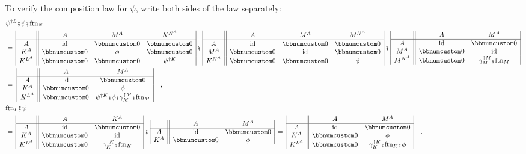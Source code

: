 To verify the composition law for $\psi$, write both sides of the
law separately:
\begin{align*}
 & \psi^{\uparrow L}\bef\psi\bef\text{ftn}_{N}\\
 & =\,\begin{array}{|c||ccc|}
 & A & M^{A} & K^{N^{A}}\\
\hline A & \text{id} & \bbnum 0 & \bbnum 0\\
K^{A} & \bbnum 0 & \phi & \bbnum 0\\
K^{L^{A}} & \bbnum 0 & \bbnum 0 & \psi^{\uparrow K}
\end{array}\,\bef\,\begin{array}{|c||ccc|}
 & A & M^{A} & M^{N^{A}}\\
\hline A & \text{id} & \bbnum 0 & \bbnum 0\\
M^{A} & \bbnum 0 & \text{id} & \bbnum 0\\
K^{N^{A}} & \bbnum 0 & \bbnum 0 & \phi
\end{array}\,\bef\,\begin{array}{|c||cc|}
 & A & M^{A}\\
\hline A & \text{id} & \bbnum 0\\
M^{A} & \bbnum 0 & \text{id}\\
M^{N^{A}} & \bbnum 0 & \gamma_{M}^{\uparrow M}\bef\text{ftn}_{M}
\end{array}\\
 & =\,\,\begin{array}{|c||cc|}
 & A & M^{A}\\
\hline A & \text{id} & \bbnum 0\\
K^{A} & \bbnum 0 & \phi\\
K^{L^{A}} & \bbnum 0 & \psi^{\uparrow K}\bef\phi\bef\gamma_{M}^{\uparrow M}\bef\text{ftn}_{M}
\end{array}\quad,\\
 & \text{ftn}_{L}\bef\psi\\
 & =\,\begin{array}{|c||cc|}
 & A & K^{A}\\
\hline A & \text{id} & \bbnum 0\\
K^{A} & \bbnum 0 & \text{id}\\
K^{L^{A}} & \bbnum 0 & \gamma_{K}^{\uparrow K}\bef\text{ftn}_{K}
\end{array}\,\bef\,\begin{array}{|c||cc|}
 & A & M^{A}\\
\hline A & \text{id} & \bbnum 0\\
K^{A} & \bbnum 0 & \phi
\end{array}\,=\,\begin{array}{|c||cc|}
 & A & M^{A}\\
\hline A & \text{id} & \bbnum 0\\
K^{A} & \bbnum 0 & \phi\\
K^{L^{A}} & \bbnum 0 & \gamma_{K}^{\uparrow K}\bef\text{ftn}_{K}\bef\phi
\end{array}\quad.
\end{align*}
